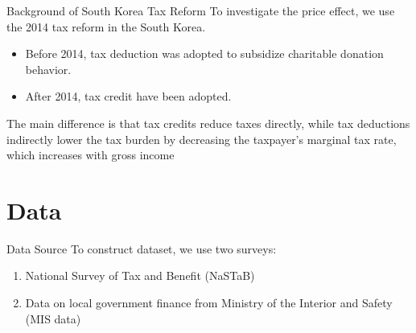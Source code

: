 \documentclass[
  ignorenonframetext,
]{beamer}
\providecommand{\tightlist}{%
  \setlength{\itemsep}{0pt}\setlength{\parskip}{0pt}}
\begin{document}
\begin{frame}{Background of South Korea Tax Reform}
\protect\hypertarget{background-of-south-korea-tax-reform}{}
To investigate the price effect, we use the 2014 tax reform in the South
Korea.

\begin{itemize}
\tightlist
\item
  Before 2014, tax deduction was adopted to subsidize charitable
  donation behavior.
\item
  After 2014, tax credit have been adopted.
\end{itemize}

The main difference is that tax credits reduce taxes directly, while tax
deductions indirectly lower the tax burden by decreasing the taxpayer's
marginal tax rate, which increases with gross income
\end{frame}

\hypertarget{data}{%
\section{Data}\label{data}}

\begin{frame}{Data Source}
\protect\hypertarget{data-source}{}
To construct dataset, we use two surveys:

\begin{enumerate}
\tightlist
\item
  National Survey of Tax and Benefit (NaSTaB)
\item
  Data on local government finance from Ministry of the Interior and
  Safety (MIS data)
\end{enumerate}
\end{frame}
\end{document}
